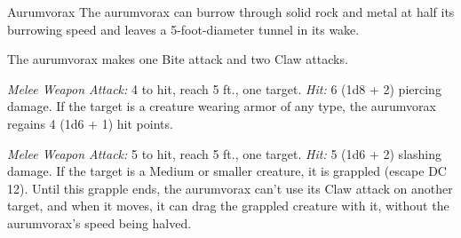 \documentclass[10pt,a4paper,twoside,bg=print,twocolumn,openany,nodeprecatedcode]{dndbook}
\begin{document}
\begin{DndMonster}[float=t]{Aurumvorax}
\DndMonsterBasics[
armor-class = {15 (natural armor)},
hit-points = {\DndDice{8d6 + 8}},
speed = {30 ft., burrow 20 ft.}
]
\DndMonsterAbilityScores[
 str = 14,
 dex = 13,
 con = 12,
 int = 3,
 wis = 12,
 cha = 6
]
\DndMonsterDetails[
saving-throws = {Str +4, Con +3},
skills = {Perception +3, Stealth +3},
condition-immunities = {petrified},
senses = {darkvision 60 ft., passive perception 13},
challenge = 2,
]
The aurumvorax can burrow through solid rock and metal at half its burrowing speed and leaves a 5-foot-diameter tunnel in its wake.

The aurumvorax makes one Bite attack and two Claw attacks.

\textsl{Melee Weapon Attack:} 4 to hit, reach 5 ft., one target. \textsl{Hit:} 6 (1d8 + 2) piercing damage. If the target is a creature wearing armor of any type, the aurumvorax regains 4 (1d6 + 1) hit points.

\textsl{Melee Weapon Attack:} 5 to hit, reach 5 ft., one target. \textsl{Hit:} 5 (1d6 + 2) slashing damage. If the target is a Medium or smaller creature, it is grappled (escape DC 12). Until this grapple ends, the aurumvorax can't use its Claw attack on another target, and when it moves, it can drag the grappled creature with it, without the aurumvorax's speed being halved.

\end{DndMonster}
\end{document}
